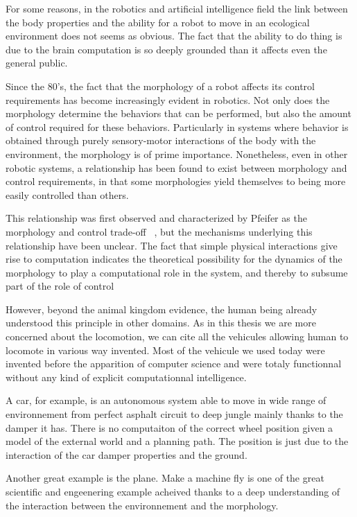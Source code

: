 For some reasons, in the robotics and artificial intelligence field the link between the body properties and the ability for a robot to move in an ecological environment does not seems as obvious. The fact that the ability to do thing is due to the brain computation is so deeply grounded than it affects even the general public.

Since the 80's, the fact that the morphology of a robot affects its control requirements has become increasingly evident in robotics. Not only does the morphology determine the behaviors that can be performed, but also the amount of control required for these behaviors. Particularly in systems where behavior is obtained through purely sensory-motor interactions of the body with the environment, the morphology is of prime importance. Nonetheless, even in other robotic systems, a relationship has been found to exist between morphology and control requirements, in that some morphologies yield themselves to being more easily controlled than others.

This relationship was first observed and characterized by Pfeifer as the morphology and control trade-off ~\cite{pfeifer2001understanding}, but the mechanisms underlying this relationship have been unclear. The fact that simple physical interactions give rise to computation indicates the theoretical possibility for the dynamics of the morphology to play a computational role in the system, and thereby to subsume part of the role of control~\cite{paulinvestigation}

However, beyond the animal kingdom evidence, the human being already understood this principle in other domains. As in this thesis we are more concerned about the locomotion, we can cite all the vehicules allowing human to locomote in various way invented. Most of the vehicule we used today were invented before the apparition of computer science and were totaly functionnal without any kind of explicit computationnal intelligence.

A car, for example, is an autonomous system able to move in wide range of environnement from perfect asphalt circuit to deep jungle mainly thanks to the damper it has. There is no computaiton of the correct wheel position given a model of the external world and a planning path. The position is just due to the interaction of the car damper properties and the ground.

Another great example is the plane. Make a machine fly is one of the great scientific and engeenering example acheived thanks to a deep understanding of the interaction between the environnement and the morphology.



